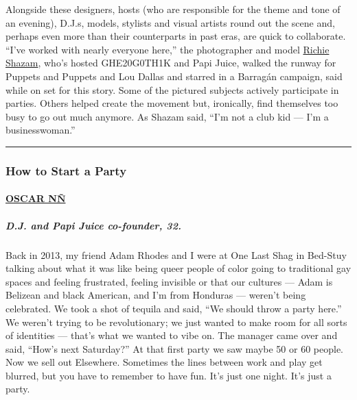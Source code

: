 Alongside these designers, hosts (who are responsible for the theme and
tone of an evening), D.J.s, models, stylists and visual artists round
out the scene and, perhaps even more than their counterparts in past
eras, are quick to collaborate. ``I've worked with nearly everyone
here,'' the photographer and model
\href{https://www.instagram.com/richieshazam/?hl=en}{Richie Shazam},
who's hosted GHE20G0TH1K and Papi Juice, walked the runway for Puppets
and Puppets and Lou Dallas and starred in a Barragán campaign, said
while on set for this story. Some of the pictured subjects actively
participate in parties. Others helped create the movement but,
ironically, find themselves too busy to go out much anymore. As Shazam
said, ``I'm not a club kid --- I'm a businesswoman.''

\begin{center}\rule{0.5\linewidth}{\linethickness}\end{center}

\hypertarget{how-to-start-a-party}{%
\subsubsection{How to Start a Party}\label{how-to-start-a-party}}

\hypertarget{oscar-nuxf1}{%
\paragraph{\texorpdfstring{\href{https://www.instagram.com/oscarnn/?hl=en}{OSCAR
NÑ}}{OSCAR NÑ}}\label{oscar-nuxf1}}

\hypertarget{dj-and-papi-juice-co-founder-32}{%
\subparagraph{\texorpdfstring{\textbf{D.J. and Papi Juice co-founder,
32.}}{D.J. and Papi Juice co-founder, 32.}}\label{dj-and-papi-juice-co-founder-32}}

Back in 2013, my friend Adam Rhodes and I were at One Last Shag in
Bed-Stuy talking about what it was like being queer people of color
going to traditional gay spaces and feeling frustrated, feeling
invisible or that our cultures --- Adam is Belizean and black American,
and I'm from Honduras --- weren't being celebrated. We took a shot of
tequila and said, ``We should throw a party here.'' We weren't trying to
be revolutionary; we just wanted to make room for all sorts of
identities --- that's what we wanted to vibe on. The manager came over
and said, ``How's next Saturday?'' At that first party we saw maybe 50
or 60 people. Now we sell out Elsewhere. Sometimes the lines between
work and play get blurred, but you have to remember to have fun. It's
just one night. It's just a party.

